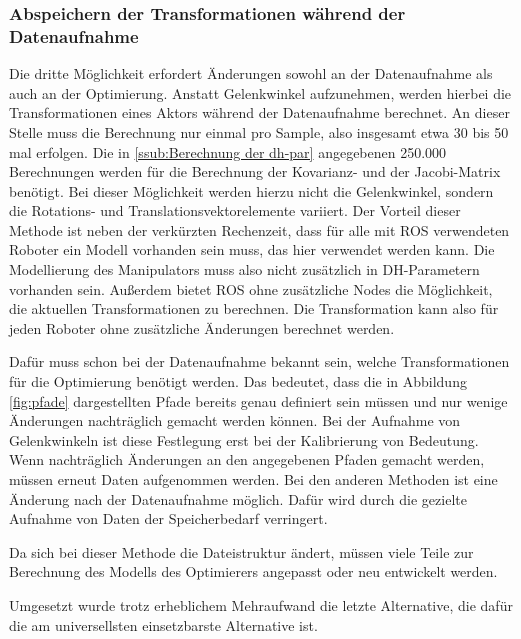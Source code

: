 \subsubsection{Abspeichern der Transformationen während der Datenaufnahme} %
\label{ssub:Abspeichern der Transformationen während der Datenaufnahme}


 Die dritte Möglichkeit erfordert Änderungen sowohl an der Datenaufnahme als auch an der Optimierung.
 Anstatt Gelenkwinkel aufzunehmen, werden hierbei die Transformationen eines Aktors während der Datenaufnahme
 berechnet. An dieser Stelle muss die Berechnung nur einmal pro Sample, also insgesamt etwa 30 bis 50 mal 
 erfolgen. Die in \ref{ssub:Berechnung der dh-par} angegebenen 250.000 Berechnungen werden für die Berechnung 
 der Kovarianz- und der Jacobi-Matrix benötigt. Bei dieser Möglichkeit werden hierzu nicht die Gelenkwinkel,
 sondern die Rotations- und Translationsvektorelemente variiert.
 Der Vorteil dieser Methode ist neben der verkürzten Rechenzeit, dass für alle mit \ac{ROS} verwendeten 
 Roboter ein Modell vorhanden sein muss, das hier verwendet werden kann. Die Modellierung des Manipulators
 muss also nicht zusätzlich in \ac{DH-Parameter}n vorhanden sein. Außerdem 
 bietet \ac{ROS} ohne zusätzliche Nodes die Möglichkeit, die aktuellen Transformationen
 zu berechnen. Die Transformation kann also für jeden Roboter ohne zusätzliche
 Änderungen berechnet werden.
 
 Dafür muss schon bei der Datenaufnahme bekannt sein, welche Transformationen für die Optimierung benötigt 
 werden. Das bedeutet, dass die in Abbildung \ref{fig:pfade} dargestellten Pfade bereits genau
 definiert sein müssen und nur wenige Änderungen nachträglich gemacht werden können. Bei der 
 Aufnahme von Gelenkwinkeln ist diese Festlegung erst bei der Kalibrierung von Bedeutung. 
 Wenn nachträglich Änderungen an den angegebenen Pfaden gemacht werden, müssen 
 erneut Daten aufgenommen werden. Bei den anderen Methoden ist eine Änderung nach
 der Datenaufnahme möglich. Dafür wird durch die gezielte Aufnahme von Daten der
 Speicherbedarf verringert.

 Da sich bei dieser Methode die Dateistruktur ändert, müssen viele Teile zur 
 Berechnung des Modells des Optimierers angepasst oder neu entwickelt werden. 


Umgesetzt wurde trotz erheblichem Mehraufwand die letzte Alternative, die dafür
die am universellsten einsetzbarste Alternative ist. 

